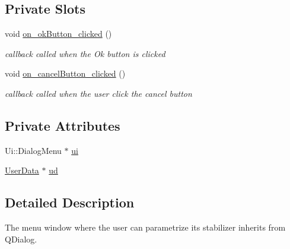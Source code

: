 \subsection*{Private Slots}
\begin{DoxyCompactItemize}
\item 
\hypertarget{class_dialog_menu_a596866b7a1143ec8e18f74f7af1642a2}{void \hyperlink{class_dialog_menu_a596866b7a1143ec8e18f74f7af1642a2}{on\-\_\-ok\-Button\-\_\-clicked} ()}\label{class_dialog_menu_a596866b7a1143ec8e18f74f7af1642a2}

\begin{DoxyCompactList}\small\item\em callback called when the Ok button is clicked \end{DoxyCompactList}\item 
\hypertarget{class_dialog_menu_a832c6b9e32f086e1d2bf76feb2430b1b}{void \hyperlink{class_dialog_menu_a832c6b9e32f086e1d2bf76feb2430b1b}{on\-\_\-cancel\-Button\-\_\-clicked} ()}\label{class_dialog_menu_a832c6b9e32f086e1d2bf76feb2430b1b}

\begin{DoxyCompactList}\small\item\em callback called when the user click the cancel button \end{DoxyCompactList}\end{DoxyCompactItemize}
\subsection*{Private Attributes}
\begin{DoxyCompactItemize}
\item 
Ui\-::\-Dialog\-Menu $\ast$ \hyperlink{class_dialog_menu_a444aa7e99286d574d9779f728021c897}{ui}
\item 
\hyperlink{class_user_data}{User\-Data} $\ast$ \hyperlink{class_dialog_menu_af1ca62b0cbef0e0f6675a79df8b5b586}{ud}
\end{DoxyCompactItemize}


\subsection{Detailed Description}
The menu window where the user can parametrize its stabilizer inherits from Q\-Dialog. 

